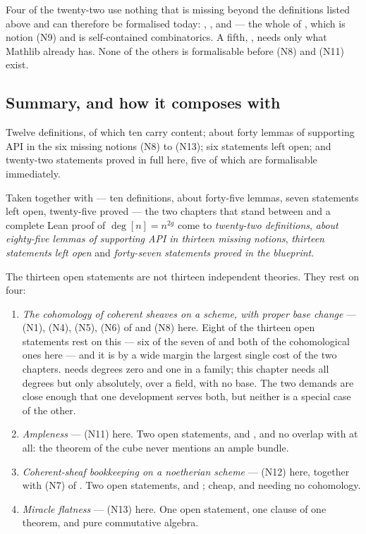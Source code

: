 Four of the twenty-two use nothing that is missing beyond the definitions
listed above and can therefore be formalised today:
,
,
 and
 --- the whole of
, which is notion (N9) and is self-contained
combinatorics.  A fifth, , needs only what
Mathlib already has.  None of the others is formalisable before (N8) and (N11)
exist.

\subsection*{Summary, and how it composes with }

Twelve definitions, of which ten carry content; about forty lemmas of
supporting API in the six missing notions (N8) to (N13); six statements left
open; and twenty-two statements proved in full here, five of which are
formalisable immediately.

Taken together with  --- ten definitions, about forty-five
lemmas, seven statements left open, twenty-five proved --- the two chapters
that stand between  and a complete Lean proof of
$\deg[n]=n^{2g}$ come to \emph{twenty-two definitions}, \emph{about
eighty-five lemmas of supporting API in thirteen missing notions}, \emph{thirteen
statements left open} and \emph{forty-seven statements proved in the
blueprint}.

The thirteen open statements are not thirteen independent theories.  They rest
on four:
\begin{enumerate}
  \item \emph{The cohomology of coherent sheaves on a scheme, with proper base
  change} --- (N1), (N4), (N5), (N6) of  and (N8) here.
  Eight of the thirteen open statements rest on this --- six of the seven of
   and both of the cohomological ones here --- and it is by
  a wide margin the largest single cost of the two chapters.
   needs degrees zero and one in a family; this chapter needs
  all degrees but only absolutely,
  over a field, with no base.  The two demands are close enough that one
  development serves both, but neither is a special case of the other.
  \item \emph{Ampleness} --- (N11) here.  Two open statements,
   and , and no
  overlap with  at all: the theorem of the cube never mentions
  an ample bundle.
  \item \emph{Coherent-sheaf bookkeeping on a noetherian scheme} --- (N12)
  here, together with (N7) of .  Two open statements,
   and
  ; cheap, and needing no
  cohomology.
  \item \emph{Miracle flatness} --- (N13) here.  One open statement, one
  clause of one theorem, and pure commutative algebra.
\end{enumerate}

